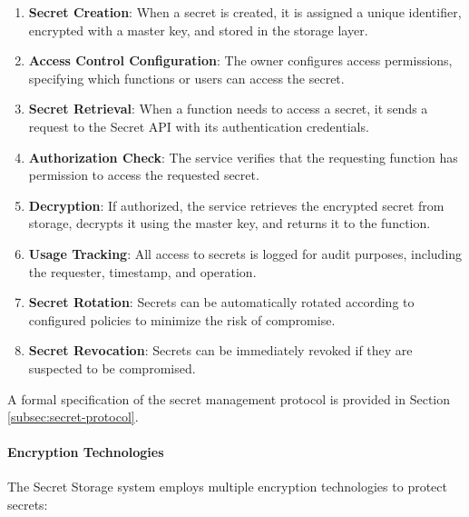 \begin{enumerate}
    \item \textbf{Secret Creation}: When a secret is created, it is assigned a unique identifier, encrypted with a master key, and stored in the storage layer.
    
    \item \textbf{Access Control Configuration}: The owner configures access permissions, specifying which functions or users can access the secret.
    
    \item \textbf{Secret Retrieval}: When a function needs to access a secret, it sends a request to the Secret API with its authentication credentials.
    
    \item \textbf{Authorization Check}: The service verifies that the requesting function has permission to access the requested secret.
    
    \item \textbf{Decryption}: If authorized, the service retrieves the encrypted secret from storage, decrypts it using the master key, and returns it to the function.
    
    \item \textbf{Usage Tracking}: All access to secrets is logged for audit purposes, including the requester, timestamp, and operation.
    
    \item \textbf{Secret Rotation}: Secrets can be automatically rotated according to configured policies to minimize the risk of compromise.
    
    \item \textbf{Secret Revocation}: Secrets can be immediately revoked if they are suspected to be compromised.
\end{enumerate}

A formal specification of the secret management protocol is provided in Section \ref{subsec:secret-protocol}.



\paragraph{Encryption Technologies}
The Secret Storage system employs multiple encryption technologies to protect secrets:

